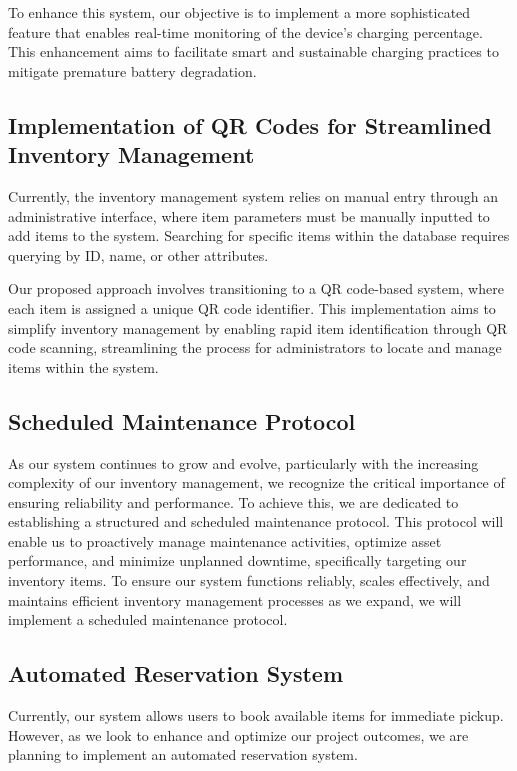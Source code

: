 To enhance this system, our objective is to implement a more sophisticated feature that enables 
real-time monitoring of the device's charging percentage. This enhancement aims to facilitate smart and 
sustainable charging practices to mitigate premature battery degradation.


\subsection{Implementation of QR Codes for Streamlined Inventory Management}
Currently, the inventory management system relies on manual entry through an administrative interface,
 where item parameters must be manually inputted to add items to the system. 
 Searching for specific items within the database requires querying by ID, name, or other attributes.

Our proposed approach involves transitioning to a QR code-based system, where each item is assigned
 a unique QR code identifier. 
 This implementation aims to simplify inventory management by enabling rapid item identification 
 through QR code scanning, streamlining the process for administrators to locate and manage items
 within the system.

\subsection{Scheduled Maintenance Protocol}
As our system continues to grow and evolve, particularly with the increasing complexity of our inventory management,
we recognize the critical importance of ensuring reliability and performance. 
To achieve this, we are dedicated to establishing a structured and scheduled maintenance protocol. 
This protocol will enable us to proactively manage maintenance activities, optimize asset performance,
and minimize unplanned downtime, specifically targeting our inventory items. To ensure our system functions reliably,
 scales effectively, and maintains efficient inventory management processes as we expand, we will implement a scheduled maintenance protocol.


\subsection{Automated Reservation System}

Currently, our system allows users to book available items for immediate pickup. However, as we look to enhance and optimize our project outcomes, we are planning to implement an automated reservation system.

